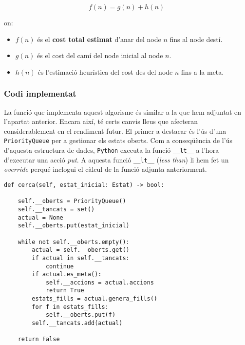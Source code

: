 \documentclass{article}
\begin{document}
\[
f(n) = g(n) + h(n)
\]

on:
\begin{itemize}
    \item \( f(n) \) és el \textbf{cost total estimat} d'anar del node \( n \) fins al node destí.
    \item \( g(n) \) és el cost del camí del node inicial al node \( n \).
    \item \( h(n) \) és l'estimació heurística del cost des del node \( n \) fins a la meta.
\end{itemize}

\subsubsection{Codi implementat}
La funció que implementa aquest algorisme és similar a la que hem adjuntat en l'apartat anterior. Encara així, té certs canvis lleus que afecteran considerablement en el rendiment futur. El primer a destacar és l'ús d'una \verb|PriorityQueue| per a gestionar els estats oberts. Com a conseqüència de l'ús d'aquesta estructura de dades, \verb|Python| executa la funció \verb|__lt__| a l'hora d'executar una acció \textit{put}. A aquesta funció \verb|__lt__| (\textit{less than}) li hem fet un \textit{override} perqué inclogui el càlcul de la funció adjunta anteriorment. 

\begin{verbatim}
def cerca(self, estat_inicial: Estat) -> bool:
  
    self.__oberts = PriorityQueue()
    self.__tancats = set()
    actual = None
    self.__oberts.put(estat_inicial)

    while not self.__oberts.empty():
        actual = self.__oberts.get()
        if actual in self.__tancats:
            continue
        if actual.es_meta():
            self.__accions = actual.accions
            return True
        estats_fills = actual.genera_fills()
        for f in estats_fills:
            self.__oberts.put(f)
        self.__tancats.add(actual)
        
    return False
    
\end{verbatim}

\newpage
\end{document}
